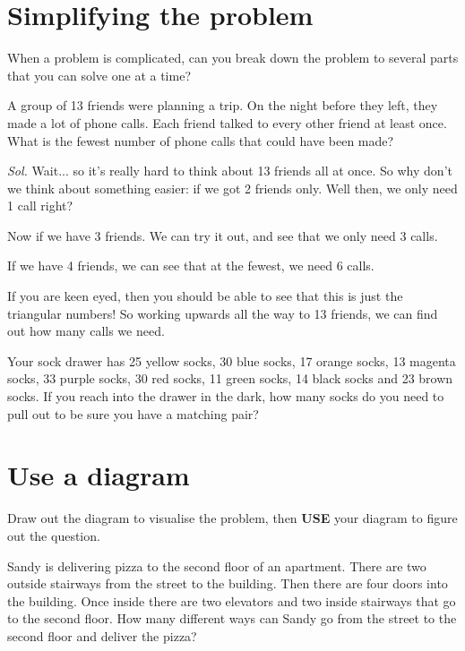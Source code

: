 \documentclass{article}
\theoremstyle{mytheoremstyle}
\theoremstyle{mytheoremstyle}
\theoremstyle{myproblemstyle}
\theoremstyle{myproblemstyle}
\begin{document}
    
    \section{Simplifying the problem}
    When a problem is complicated, can you break down the problem to several parts that you can solve one at a time?

    \begin{example}
        A group of 13 friends were planning a trip. On the night before they left, they made a lot of phone calls. Each friend talked to every other friend at least once. What is the fewest number of phone calls that could have been made?
    \end{example}

    \textit{ Sol. } Wait... so it's really hard to think about 13 friends all at once. So why don't we think about something easier: if we got 2 friends only. Well then, we only need 1 call right?

    Now if we have 3 friends. We can try it out, and see that we only need 3 calls. 

    If we have 4 friends, we can see that at the fewest, we need 6 calls.

    If you are keen eyed, then you should be able to see that this is just the triangular numbers! So working upwards all the way to 13 friends, we can find out how many calls we need.
   
    \begin{problem}
        Your sock drawer has 25 yellow socks, 30 blue socks, 17 orange socks, 13 magenta socks, 33 purple socks, 30 red socks, 11 green socks, 14 black socks and 23 brown socks. If you reach into the drawer in the dark, how many socks do you need to pull out to be sure you have a matching pair?
    \end{problem}


    \section{Use a diagram}
    Draw out the diagram to visualise the problem, then \textbf{USE} your diagram to figure out the question.

    \begin{example}
        Sandy is delivering pizza to the second floor of an apartment. There are two outside stairways from the street to the building. Then there are four doors into the building. Once inside there are two elevators and two inside stairways that go to the second floor. How many different ways can Sandy go from the street to the second floor and deliver the pizza?
    \end{example}
\end{document}
